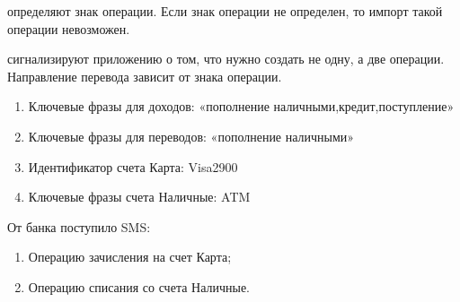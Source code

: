 \documentclass[a4paper,10pt,russian]{sphinxmanual}
\begin{document}
\sphinxAtStartPar
{} определяют знак операции. Если знак операции не определен, то импорт такой операции невозможен.

\sphinxAtStartPar
{} сигнализируют приложению о том, что нужно создать не одну, а две операции. Направление
перевода зависит от знака операции.
\begin{description}
\begin{enumerate}
%
\item {} 
\sphinxAtStartPar
Ключевые фразы для доходов: «пополнение наличными,кредит,поступление»

\item {} 
\sphinxAtStartPar
Ключевые фразы для переводов: «пополнение наличными»

\item {} 
\sphinxAtStartPar
Идентификатор счета Карта: Visa2900

\item {} 
\sphinxAtStartPar
Ключевые фразы счета Наличные: ATM

\end{enumerate}

\end{description}

\sphinxAtStartPar
От банка поступило SMS:

\begin{sphinxVerbatim}[commandchars=\\\{\}]
         
\end{sphinxVerbatim}
\begin{description}
\begin{enumerate}
%
\item {} 
\sphinxAtStartPar
Операцию зачисления на счет Карта;

\item {} 
\sphinxAtStartPar
Операцию списания со счета Наличные.

\end{enumerate}

\end{description}
\end{document}
